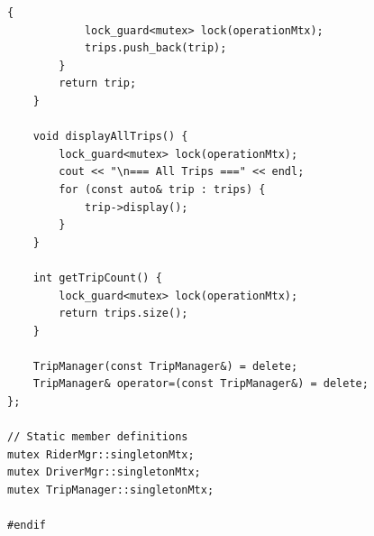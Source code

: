 \documentclass[11pt,a4paper]{article}
\begin{document}
\begin{lstlisting}[title={\texttt{managers.hpp}}]
        {
            lock_guard<mutex> lock(operationMtx);
            trips.push_back(trip);
        }
        return trip;
    }

    void displayAllTrips() {
        lock_guard<mutex> lock(operationMtx);
        cout << "\n=== All Trips ===" << endl;
        for (const auto& trip : trips) {
            trip->display();
        }
    }

    int getTripCount() {
        lock_guard<mutex> lock(operationMtx);
        return trips.size();
    }

    TripManager(const TripManager&) = delete;
    TripManager& operator=(const TripManager&) = delete;
};

// Static member definitions
mutex RiderMgr::singletonMtx;
mutex DriverMgr::singletonMtx;
mutex TripManager::singletonMtx;

#endif
\end{lstlisting}

\newpage
\end{document}
